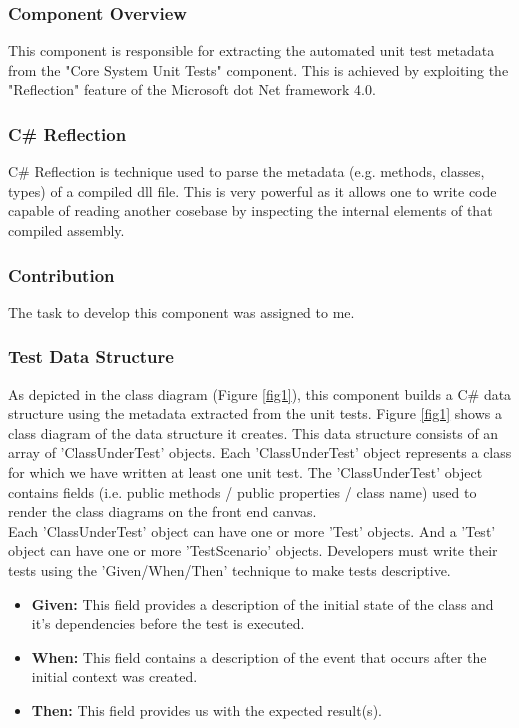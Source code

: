 \documentclass[a4paper,12pt]{article}
\begin{document}
\subsubsection{Component Overview}
This component is responsible for extracting the automated unit test metadata from the "Core System Unit Tests" component. This is achieved by exploiting the "Reflection\cite{reflection}" feature of the Microsoft dot Net framework 4.0\cite{dotNetFramework}.
\subsubsection{C\# Reflection}
C\# Reflection\cite{reflection} is technique used to parse the metadata (e.g. methods, classes, types) of a compiled dll file. This is very powerful as it allows one to write code capable of reading another cosebase by inspecting the internal elements of that compiled assembly.
\subsubsection{Contribution}
The task to develop this component was assigned to me. 
\subsubsection{Test Data Structure}
As depicted in the class diagram (Figure \ref{fig1}), this component builds a C\# data structure using the metadata extracted from the unit tests. Figure \ref{fig1} shows a class diagram of the data structure it creates. This data structure consists of an array of 'ClassUnderTest' objects. Each 'ClassUnderTest' object represents a class for which we have written at least one unit test. The 'ClassUnderTest' object contains fields (i.e. public methods / public properties / class name) used to render the class diagrams on the front end canvas.\\
\linebreak
Each 'ClassUnderTest' object can have one or more 'Test' objects. And a 'Test' object can have one or more 'TestScenario' objects. Developers must write their tests using the 'Given/When/Then'\cite{gwt} technique to make tests descriptive. 
\begin{itemize}
\item \textbf{Given:} This field provides a description of the initial state of the class and it's dependencies before the test is executed.
\item \textbf{When:} This field contains a description of the event that occurs after the initial  context was created.
\item \textbf{Then:} This field provides us with the expected result(s).
\end{itemize}  
\end{document}
